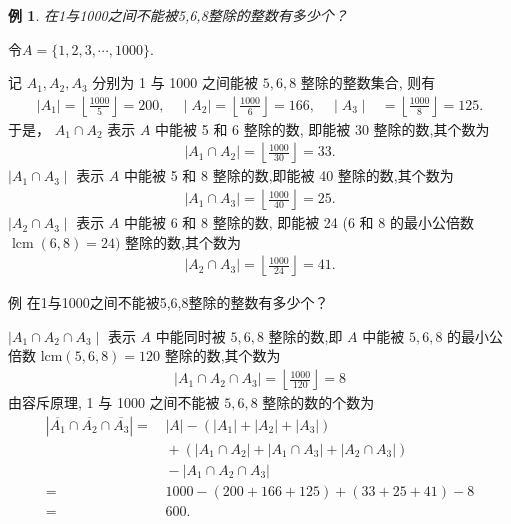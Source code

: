 \documentclass[punct]{ctexbeamer}
\newtheorem{ex}{例}
\def\sol{\noindent {\bf 解\ }}
\begin{document}
\begin{frame}
	\begin{ex}
		在1与1000之间不能被5,6,8整除的整数有多少个？
	\end{ex}
	\pause
\sol 令$A=\{1,2,3, \cdots, 1000 \} . $

记 $ A_{1}, A_{2}, A_{3}$ 分别为 1 与 1000 之间能被 $5,6,8$ 整除的整数集合, 则有
\begin{align*}
    \mid A_{1} \mid =\left\lfloor\frac{1000}{5} \right\rfloor=200, \quad
    \mid 	A_{2} \mid =\left\lfloor\frac{1000}{6}\right\rfloor=166,   \quad
    \mid  A_{3} \mid  &=\left\lfloor\frac{1000}{8}\right\rfloor=125.
\end{align*}
于是， $A_{1} \cap A_{2}$ 表示 $A$ 中能被 5 和 6 整除的数, 即能被 30 整除的数,其个数为
\begin{align*}
    \mid	A_{1} \cap A_{2} \mid=\left\lfloor\frac{1000}{30}\right\rfloor=33.
\end{align*}
$\mid A_{1} \cap A_{3} \mid $ 表示 $A$ 中能被 5 和 8 整除的数,即能被 40 整除的数,其个数为
\begin{align*}
    \mid	A_{1} \cap A_{3} \mid=\left\lfloor\frac{1000}{40}\right\rfloor=25.
\end{align*}
$\mid A_{2} \cap A_{3} \mid$ 表示 $A$ 中能被 6 和 8 整除的数, 即能被 24 (6 和 8 的最小公倍数 $\operatorname{lcm}(6,8)=24)$ 整除的数,其个数为
\begin{align*}
    \mid	A_{2} \cap A_{3} \mid=\left\lfloor\frac{1000}{24}\right\rfloor=41.
\end{align*}
\end{frame}


\begin{frame}
\begin{block}{例}
    在1与1000之间不能被5,6,8整除的整数有多少个？
\end{block}

$\mid A_{1} \cap A_{2} \cap A_{3}\mid$ 表示 $A$ 中能同时被 $5,6,8$ 整除的数,即 $A$ 中能被 $5,6,8$ 的最小公 倍数 $\mathrm{lcm}(5,6,8)=120$ 整除的数,其个数为
\begin{align*}
    \mid A_{1} \cap A_{2}   \cap A_{3} \mid=\left\lfloor\frac{1000}{120}\right\rfloor=8
\end{align*}
由容斥原理, 1 与 1000 之间不能被 $5,6,8$ 整除的数的个数为
\begin{align*}
    \left|\overline{A_{1}} \cap \overline{A_{2}} \cap \overline{A_{3}}\right|=&\, |A|-\left(\left|A_{1}\right|+\left|A_{2}\right|+\left|A_{3}\right|\right) \\
    &\, +\left(\left|A_{1} \cap A_{2}\right|+\left|A_{1} \cap A_{3}\right|+\left|A_{2} \cap A_{3}\right|\right) \\
    &\, -\left|A_{1} \cap A_{2} \cap A_{3}\right| \\
    =&\,  1000-(200+166+125)+(33+25+41)-8 \\
    =&\,  600 .
\end{align*}
\end{frame}
\end{document}

